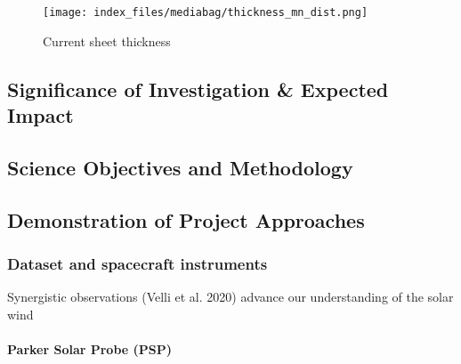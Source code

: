 \documentclass[
  letterpaper,
  DIV=11,
  numbers=noendperiod,
  oneside]{scrartcl}
\let\oldparagraph\paragraph
\renewcommand{\paragraph}[1]{\oldparagraph{#1}\mbox{}}
\begin{document}
\begin{figure}[H]

{\centering \texttt{[image: index\_files/mediabag/thickness\_mn\_dist.png]}

}

\caption{Current sheet thickness}

\end{figure}%

\newpage{}

\subsection{Significance of Investigation \& Expected
Impact}\label{significance-of-investigation-expected-impact}

\subsection{Science Objectives and
Methodology}\label{science-objectives-and-methodology}

\subsection{Demonstration of Project
Approaches}\label{demonstration-of-project-approaches}

\subsubsection{Dataset and spacecraft
instruments}\label{dataset-and-spacecraft-instruments}

Synergistic observations (Velli et al. 2020) advance our understanding
of the solar wind

\paragraph{Parker Solar Probe (PSP)}
\end{document}
